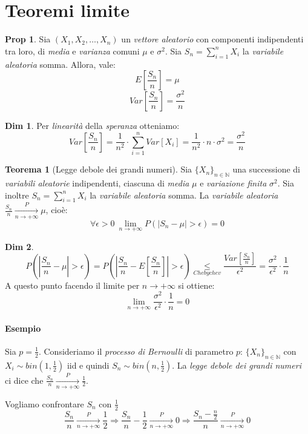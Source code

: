 \documentclass[12pt, a4paper]{report}
\theoremstyle{definition}
\newtheorem{theorem}{Teorema}[section]
\newtheorem*{demonstration}{Dim}
\newtheorem*{proposition}{Prop}
\DeclareRobustCommand{\N}{\mathbb{N}}%
\newcommand\underrel[2]{\mathrel{\mathop{#2}\limits_{#1}}}%
\newcommand\conv[2]{\xrightarrow[#2\to +\infty]{#1}}
\begin{document}
\section{Teoremi limite}
\begin{proposition}
	Sia \((X_1,X_2,\dots,X_n)\) un \emph{vettore aleatorio} con componenti
	indipendenti tra loro, di \emph{media} e \emph{varianza} comuni $\mu$ e $\sigma^2$.
	Sia \(S_n=\sum_{i=1}^nX_i\) la \emph{variabile aleatoria} somma. Allora, vale:
	\[E\left[\frac{S_n}{n}\right]=\mu\]
	\[Var\left[\frac{S_n}{n}\right]=\frac{\sigma^2}{n}\]
\end{proposition}
\begin{demonstration}
	Per \emph{linearità} della \emph{speranza} otteniamo:
	\[Var\left[\frac{S_n}{n}\right]=\frac{1}{n^2}\cdot \sum_{i=1}^nVar[X_i]=\frac{1}
	{n^2}\cdot n\cdot \sigma^2=\frac{\sigma^2}{n}\]
\end{demonstration}

\begin{theorem}[Legge debole dei grandi numeri]
	Sia \(\{X_n\}_{n\in\N}\) una successione di \emph{variabili aleatorie} indipendenti,
	ciascuna di \emph{media} $\mu$	e \emph{variazione finita} $\sigma^2$. Sia
	inoltre \(S_n=\sum_{i=1}^nX_i\) la \emph{variabile aleatoria} somma. La
	\emph{variabile aleatoria} \(\frac{S_n}{n}\conv{P}{n}\mu\), cioè:
	\[\forall\epsilon>0\ \lim_{n\to +\infty}P(|S_n-\mu|>\epsilon)=0\]
\end{theorem}
\begin{demonstration}
	\[P\left(|\frac{S_n}{n}-\mu|>\epsilon\right)=P\left(|\frac{S_n}{n}-E\left[
	\frac{S_n}{n}\right]|>\epsilon\right)\underrel{Chebychev}{\leq}\frac{Var\left[
	\frac{S_n}{n}\right]}{\epsilon^2}=\frac{\sigma^2}{\epsilon^2}\cdot \frac{1}{n}\]
	A questo punto facendo il limite per \(n\to +\infty\) si ottiene:
	\[\lim_{n\to +\infty}\frac{\sigma^2}{\epsilon^2}\cdot \frac{1}{n}=0\]
\end{demonstration}

\paragraph*{Esempio}
Sia $p=\frac{1}{2}$. Consideriamo il \emph{processo di Bernoulli} di parametro
$p$: \(\{X_n\}_{n\in\N}\) con \(X_i\sim bin(1,\frac{1}{2})\) iid e quindi
\(S_n\sim bin(n, \frac{1}{2})\). La \emph{legge debole dei grandi numeri} ci dice
che \(\frac{S_n}{n}\conv{P}{n}\frac{1}{2}\).

Vogliamo confrontare $S_n$ con $\frac{1}{2}$
\[\frac{S_n}{n}\conv{P}{n}\frac{1}{2}\Rightarrow\frac{S_n}{n}-\frac{1}{2}\conv{P}
{n}0\Rightarrow\frac{S_n-\frac{n}{2}}{n}\conv{P}{n}0\]
\end{document}

